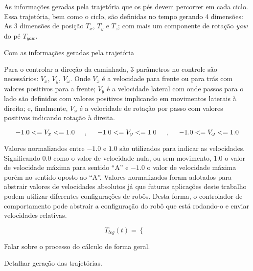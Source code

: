 As informações geradas pela trajetória que os pés devem percorrer em cada ciclo. Essa trajetória, bem como o ciclo, são definidas no tempo gerando 4 dimensões: As 3 dimensões de posição $T_x$, $T_y$ e $T_z$; com mais um componente de rotação \textit{yaw} do pé $T_{yaw}$.

Com as informações geradas pela trajetória

Para o controlar a direção da caminhada, 3 parâmetros no controle são necessários: $V_x$, $V_y$, $V_\omega$. Onde $V_x$ é a velocidade para frente ou para trás com valores positivos para a frente; $V_y$ é a velocidade lateral com onde passos para o lado são definidos com valores positivos implicando em movimentos laterais à direita; e, finalmente, $V_\omega$ é a velocidade de rotação por passo com valores positivos indicando rotação à direita.

\begin{equation}
	-1.0 <= V_x <= 1.0
	\hspace{5mm},\hspace{5mm}
	-1.0 <= V_y <= 1.0
	\hspace{5mm},\hspace{5mm}
	-1.0 <= V_\omega <= 1.0
	\label{eq:velocities_range}
\end{equation}

Valores normalizados entre $-1.0$ e $1.0$ são utilizados para indicar as velocidades. Significando $0.0$ como o valor de velocidade nula, ou sem movimento, $1.0$ o valor de velocidade máxima para sentido ``A'' e $-1.0$ o valor de velocidade máxima porém no sentido oposto ao ``A''. Valores normalizados foram adotados para abstrair valores de velocidades absolutos já que futuras aplicações deste trabalho podem utilizar diferentes configurações de robôs. Desta forma, o controlador de comportamento pode abstrair a configuração do robô que está rodando-o e enviar velocidades relativas.

\begin{equation}
	T_{leg}(t) = 
	\begin{cases}
		
	\end{cases}
\end{equation}

\begin{guide}
	Falar sobre o processo do cálculo de forma geral.
\end{guide}

\begin{guide}
	Detalhar geração das trajetórias.
\end{guide}

